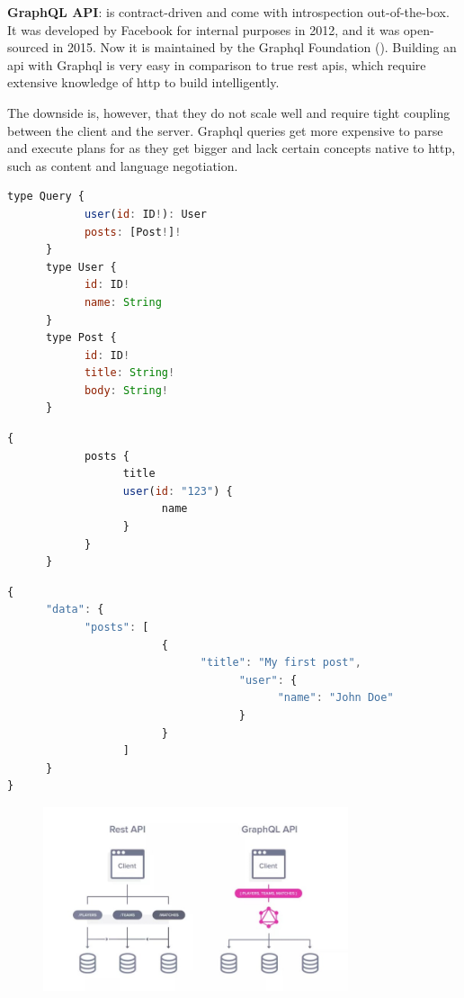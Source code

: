 \begin{multicols}{2}
\begin{multicols}{2}
      \textbf{GraphQL API}:
      is contract-driven and come with introspection out-of-the-box. It was developed by Facebook for internal purposes
      in 2012, and it was open-sourced in 2015. Now it is maintained by the Graph\acrshort{ql} Foundation (\cite{graphql}).
      Building an \acrshort{api} with Graph\acrshort{ql} is very easy in comparison to true \acrshort{rest} \acrshort{api}s,
      which require extensive knowledge of \acrshort{http} to build intelligently.

      The downside is, however, that they do not scale well and require tight coupling between the client and the
      server. Graph\acrshort{ql} queries get more expensive to parse and execute plans for as they get bigger and
      lack certain concepts native to \acrshort{http}, such as content and language negotiation.
\end{multicols}
\begin{lstlisting}[language=JavaScript, caption=GraphQL's Schema Example]
      type Query {
            user(id: ID!): User
            posts: [Post!]!
      }
      type User {
            id: ID!
            name: String
      }
      type Post {
            id: ID!
            title: String!
            body: String!
      }
\end{lstlisting}
\begin{lstlisting}[language=JavaScript, caption=GraphQL's Request Example to Specific Data]
      {
            posts {
                  title
                  user(id: "123") {
                        name
                  }
            }
      }
\end{lstlisting}
\begin{lstlisting}[language=JavaScript, caption=GraphQL's Return Data Example]
{
      "data": {
            "posts": [
                        {
                              "title": "My first post",
                                    "user": {
                                          "name": "John Doe"
                                    }
                        }
                  ]
      }
}            
\end{lstlisting}
\begin{figure}[htbp] %
      \centering
      \includegraphics[width=0.8\textwidth]{Figures/graphql.jpg}

\end{figure}
\end{multicols}
